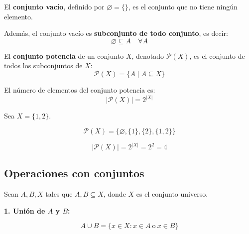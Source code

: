 \documentclass[a4paper,12pt]{article}
\begin{document}
\begin{procedimiento}[title=Conjunto vacío]
El \textbf{conjunto vacío}, definido por $\varnothing = \{\}$, es el conjunto que no tiene ningún elemento.  

Además, el conjunto vacío es \textbf{subconjunto de todo conjunto}, es decir:
\[
\varnothing \subseteq A \quad \forall A
\]
\end{procedimiento}

\begin{procedimiento}[title=Conjunto potencia]
El \textbf{conjunto potencia} de un conjunto $X$, denotado $\mathcal{P}(X)$, es el conjunto de todos los subconjuntos de $X$:
\[
\mathcal{P}(X) = \{ A \mid A \subseteq X \}
\]

El número de elementos del conjunto potencia es:
\[
|\mathcal{P}(X)| = 2^{|X|}
\]
\end{procedimiento}

\begin{ejemplo}[title=Ejemplo: Conjunto potencia]
Sea $X = \{1, 2\}$.  

\[
\mathcal{P}(X) = \{\varnothing, \{1\}, \{2\}, \{1,2\}\}
\]

\[
|\mathcal{P}(X)| = 2^{|X|} = 2^2 = 4
\]
\end{ejemplo}

\subsection{Operaciones con conjuntos}

Sean \( A, B, X \) tales que \( A, B \subseteq X \), donde \( X \) es el conjunto universo.

\begin{procedimiento}[title=Unión]
\textbf{1. Unión de \(A\) y \(B\):}

\[
A \cup B = \{ x \in X : x \in A \ \text{o} \ x \in B \}
\]

\begin{center}
\end{center}

\end{procedimiento}
\end{document}
